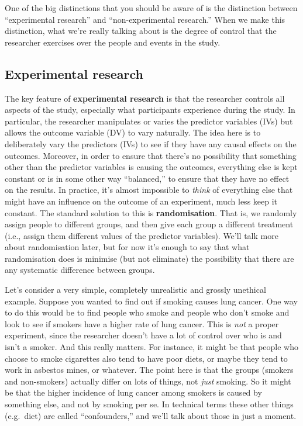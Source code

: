 \documentclass[
]{book}
\begin{document}
One of the big distinctions that you should be aware of is the distinction between ``experimental research'' and ``non-experimental research.'' When we make this distinction, what we're really talking about is the degree of control that the researcher exercises over the people and events in the study.

\hypertarget{experimental-research}{%
\subsection{Experimental research}\label{experimental-research}}

The key feature of {\textbf{experimental research}} is that the researcher controls all aspects of the study, especially what participants experience during the study. In particular, the researcher manipulates or varies the predictor variables (IVs) but allows the outcome variable (DV) to vary naturally. The idea here is to deliberately vary the predictors (IVs) to see if they have any causal effects on the outcomes. Moreover, in order to ensure that there's no possibility that something other than the predictor variables is causing the outcomes, everything else is kept constant or is in some other way ``balanced,'' to ensure that they have no effect on the results. In practice, it's almost impossible to \emph{think} of everything else that might have an influence on the outcome of an experiment, much less keep it constant. The standard solution to this is {\textbf{randomisation}}. That is, we randomly assign people to different groups, and then give each group a different treatment (i.e., assign them different values of the predictor variables). We'll talk more about randomisation later, but for now it's enough to say that what randomisation does is minimise (but not eliminate) the possibility that there are any systematic difference between groups.

Let's consider a very simple, completely unrealistic and grossly unethical example. Suppose you wanted to find out if smoking causes lung cancer. One way to do this would be to find people who smoke and people who don't smoke and look to see if smokers have a higher rate of lung cancer. This is \emph{not} a proper experiment, since the researcher doesn't have a lot of control over who is and isn't a smoker. And this really matters. For instance, it might be that people who choose to smoke cigarettes also tend to have poor diets, or maybe they tend to work in asbestos mines, or whatever. The point here is that the groups (smokers and non-smokers) actually differ on lots of things, not \emph{just} smoking. So it might be that the higher incidence of lung cancer among smokers is caused by something else, and not by smoking per se. In technical terms these other things (e.g.~diet) are called ``confounders,'' and we'll talk about those in just a moment.
\end{document}
